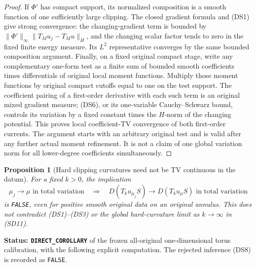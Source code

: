 \documentclass[11pt,a4paper]{article}
\numberwithin{equation}{section}
\newtheorem{proposition}[theorem]{Proposition}
\theoremstyle{definition}
\theoremstyle{remark}
\begin{document}
\begin{proof}
If $\Phi'$ has compact support, its normalized composition is
a smooth function of one sufficiently large clipping.  The
closed gradient formula and (DS1) give strong convergence:
the changing-gradient term is bounded by
$\|\Phi'\|_\infty\|T_Mu_j-T_Mu\|_H$, and the
changing scalar factor tends to zero in the fixed finite
energy measure.  Its $L^2$ representative converges by the
same bounded composition argument.  Finally, on a fixed
original compact stage, write any complementary one-form
test as a finite sum of bounded smooth coefficients times
differentials of original local moment functions.  Multiply
those moment functions by original compact cutoffs equal to
one on the test support.  The coefficient pairing of a
first-order derivative with each such term is an original
mixed gradient measure; (DS6), or its one-variable
Cauchy--Schwarz bound, controls its variation by a fixed
constant times the $H$-norm of the changing potential.
This proves local coefficient-TV convergence of both first-order
currents.  The argument starts with an arbitrary original test
and is valid after any further actual moment refinement.
It is not a claim of one global variation norm for all
lower-degree coefficients simultaneously.
\end{proof}

\begin{proposition}[Hard clipping curvatures need not be TV continuous in the datum]
\label{prop:r11-hard-clipping-source-TV-failure}
For a fixed $k>0$, the implication
\[
 \mu_j\longrightarrow\mu\text{ in total variation}
 \quad\Longrightarrow\quad
 D(T_ku_{\mu_j}S)\longrightarrow D(T_ku_\mu S)
                   \text{ in total variation}
 \tag{DS8}
\]
is \texttt{FALSE}, even for positive smooth original data on an
original annulus.  This does not contradict (DS1)--(DS3) or
the global hard-curvature limit as $k\to\infty$ in (SD11).
\end{proposition}

\noindent\textbf{Status: \texttt{DIRECT\_COROLLARY}} of the
frozen all-original one-dimensional torus calibration, with the
following explicit computation.  The rejected inference (DS8)
is recorded as \texttt{FALSE}.
\end{document}
